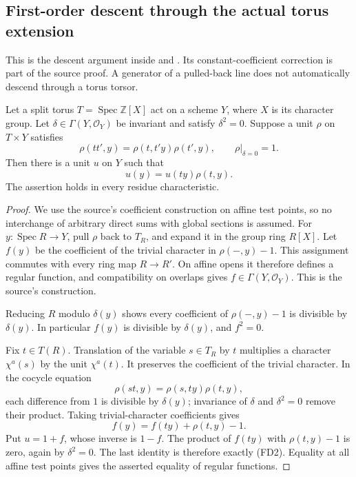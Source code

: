 \subsection{First-order descent through the actual torus extension}
\label{subsec:faithful-torus-first-order-descent}

This is the descent argument inside
 and
.  Its constant-coefficient correction
is part of the source proof.  A generator of a pulled-back
line does not automatically descend through a torus torsor.

\begin{srlemma}\label{lem:faithful-torus-nilpotent-coboundary}
Let a split torus \(T=\operatorname{Spec}\mathbb Z[X]\)
act on a scheme \(Y\), where \(X\) is its character group.
Let \(\delta\in\Gamma(Y,\mathcal O_Y)\) be invariant and
satisfy \(\delta^2=0\).
Suppose a unit \(\rho\) on \(T\times Y\) satisfies
\[
 \rho(tt',y)=\rho(t,t'y)\rho(t',y),\qquad
                              \rho|_{\delta=0}=1.
 \tag{FD1}\label{eq:faithful-torus-unit-cocycle}
\]
Then there is a unit \(u\) on \(Y\) such that
\[
                              u(y)=u(ty)\rho(t,y).
 \tag{FD2}\label{eq:faithful-torus-unit-coboundary}
\]
The assertion holds in every residue characteristic.
\end{srlemma}
\begin{proof}
We use the source's coefficient construction on affine
test points, so no interchange of arbitrary direct sums
with global sections is assumed.
For \(y:\operatorname{Spec}R\to Y\), pull \(\rho\)
back to \(T_R\), and expand it in the group ring \(R[X]\).
Let \(f(y)\) be the coefficient of the trivial character
in \(\rho(-,y)-1\).
This assignment commutes with every ring map \(R\to R'\).
On affine opens it therefore defines a regular function,
and compatibility on overlaps gives
\(f\in\Gamma(Y,\mathcal O_Y)\).
This is the source's  construction.

Reducing \(R\) modulo \(\delta(y)\) shows every coefficient
of \(\rho(-,y)-1\) is divisible by \(\delta(y)\).
In particular \(f(y)\) is divisible by \(\delta(y)\),
and \(f^2=0\).

Fix \(t\in T(R)\).
Translation of the variable \(s\in T_R\) by \(t\)
multiplies a character \(\chi^a(s)\) by the unit \(\chi^a(t)\).
It preserves the coefficient of the trivial character.
In the cocycle equation
\[
                          \rho(st,y)=\rho(s,ty)\rho(t,y),
\]
each difference from \(1\) is divisible by \(\delta(y)\);
invariance of \(\delta\) and \(\delta^2=0\) remove their
product.
Taking trivial-character coefficients gives
\[
                         f(y)=f(ty)+\rho(t,y)-1.
\]
Put \(u=1+f\), whose inverse is \(1-f\).
The product of \(f(ty)\) with \(\rho(t,y)-1\) is zero,
again by \(\delta^2=0\).
The last identity is therefore exactly (FD2).
Equality at all affine test points gives the asserted
equality of regular functions.
\end{proof}

